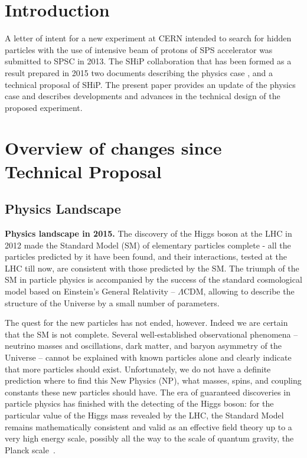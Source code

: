 \section{Introduction}
\label{sec:introduction}

A letter of intent \cite{Bonivento:2013jag} for a new experiment at CERN intended to search for hidden particles with the use of intensive beam of protons of SPS accelerator was submitted to SPSC  in 2013.  The SHiP collaboration that has been formed as a result prepared in 2015 two documents describing the physics case \cite{Alekhin:2015byh},  and a technical proposal \cite{Anelli:2015pba} of SHiP. The present paper provides an update of  the physics case and describes developments and advances in the technical design of the proposed experiment.

\section{Overview of changes since Technical Proposal}

\subsection{Physics Landscape}

{\bf Physics landscape in 2015.}  The discovery of the Higgs boson at the LHC in 2012 \cite{ATLAS:2012ae,Aad:2012tfa,Chatrchyan:2012tx,Chatrchyan:2012ufa}  made the Standard Model (SM) of elementary particles complete - all the particles predicted by it have been found, and their interactions,  tested at the LHC till now,  are consistent with those predicted by the SM. The triumph of the SM in particle physics is accompanied by the success  of the standard cosmological model based on Einstein's General Relativity -- $\Lambda$CDM, allowing to describe the structure of the Universe by a small number of parameters.

The quest for the new particles has not ended, however. Indeed we are certain that the SM is not complete. Several well-established observational phenomena -- neutrino masses and oscillations, dark matter, and baryon asymmetry of the Universe -- cannot be explained with known particles alone and clearly indicate that more particles should exist. Unfortunately, we do not have a definite prediction where to find this New Physics (NP), what masses, spins, and coupling constants these new particles should have. The era of guaranteed discoveries in particle physics has finished  with the detecting of the Higgs boson: for the particular value of the Higgs mass revealed by the LHC, the Standard Model remains mathematically consistent and valid as an effective field theory up to a very high energy scale, possibly all the way to the scale of quantum gravity, the Planck scale~\cite{Buttazzo:2013uya,Degrassi:2012ry,Bezrukov:2012sa,Bezrukov:2014ipa,Bezrukov:2014ina}.

